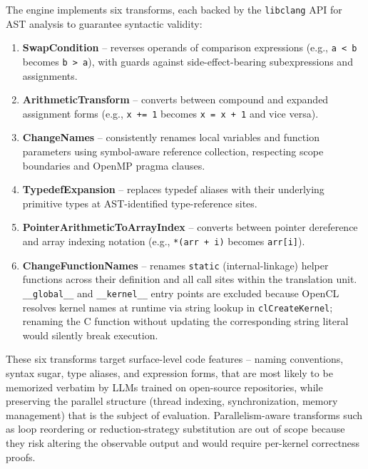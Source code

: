 The engine implements six transforms, each backed by the \texttt{libclang} API for AST analysis to guarantee syntactic validity:
\begin{enumerate}
    \item \textbf{SwapCondition} -- reverses operands of comparison expressions (e.g., \texttt{a < b} becomes \texttt{b > a}), with guards against side-effect-bearing subexpressions and assignments.
    
    \item \textbf{ArithmeticTransform} -- converts between compound and expanded assignment forms (e.g., \texttt{x += 1} becomes \texttt{x = x + 1} and vice versa). 
    
    \item \textbf{ChangeNames} -- consistently renames local variables and function parameters using symbol-aware reference collection, respecting scope boundaries and OpenMP pragma clauses.
    
    \item \textbf{TypedefExpansion} -- replaces typedef aliases with their underlying primitive types at AST-identified type-reference sites.
    \item \textbf{PointerArithmeticToArrayIndex} -- converts between pointer dereference and array indexing notation (e.g., \texttt{*(arr + i)} becomes \texttt{arr[i]}).
    
    \item \textbf{ChangeFunctionNames} -- renames \texttt{static} (internal-linkage) helper functions across their definition and all call sites within the translation unit. \texttt{\_\_global\_\_} and \texttt{\_\_kernel\_\_} entry points are excluded because OpenCL resolves kernel names at runtime via string lookup in \texttt{clCreateKernel}; renaming the C function without updating the corresponding string literal would silently break execution.
\end{enumerate}

These six transforms target surface-level code features -- naming conventions, syntax sugar, type aliases, and expression forms, that are most likely to be memorized verbatim by LLMs trained on open-source repositories, while preserving the parallel structure (thread indexing, synchronization, memory management) that is the subject of evaluation. Parallelism-aware transforms such as loop reordering or reduction-strategy substitution are out of scope because they risk altering the observable output and would require per-kernel correctness proofs.

